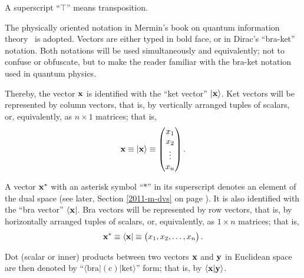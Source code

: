 A superscript ``$\intercal$'' means transposition.

The physically oriented notation in Mermin's book on
quantum information theory~\cite{mermin-04} is adopted.
Vectors are either typed in bold face, or in Dirac's ``bra-ket'' notation\cite{dirac}.
Both notations will be used simultaneously and equivalently;
not to confuse or obfuscate, but to make  the reader familiar with the bra-ket
notation used in quantum physics.

Thereby,
the vector ${\bf x}$ is identified with the ``ket vector'' $\vert {\bf x}\rangle$.
Ket vectors will be represented by column vectors, that is, by vertically arranged tuples of scalars,
or, equivalently, as $n \times 1$ matrices; that is,
\begin{equation}
{\bf x}
\equiv
\vert {\bf x}\rangle
\equiv
\begin{pmatrix}
x_1\\
x_2\\
\vdots \\
x_n
\end{pmatrix}
.
\end{equation}


A vector ${\bf x}^\ast$ with an asterisk symbol ``$\ast$'' in its superscript denotes an element of the dual space (see later, Section \ref{2011-m-dvs} on page \pageref{2011-m-dvs}).
It is also identified with the ``bra vector'' $\langle {\bf x}\vert$.
Bra vectors will be represented by row vectors, that is, by horizontally arranged tuples of scalars,
or, equivalently, as $1 \times n$ matrices; that is,
\begin{equation}
{\bf x}^\ast
\equiv
\langle {\bf x}   \vert
\equiv
\begin{pmatrix}
x_1,
x_2,
\ldots ,
x_n
\end{pmatrix}
.
\end{equation}



Dot (scalar or inner) products between two vectors ${\bf x}$ and ${\bf y}$   in Euclidean space are then
denoted by ``$\langle \textrm{bra} \vert  (\textrm{c}) \vert \textrm{ket}  \rangle$''  form;
that is, by $\langle {\bf x} \vert  {\bf y}  \rangle$.





